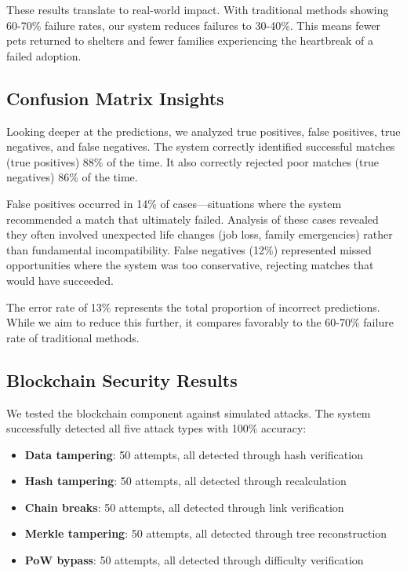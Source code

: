 \documentclass[conference]{IEEEtran}
\begin{document}
These results translate to real-world impact. With traditional methods showing 60-70\% failure rates, our system reduces failures to 30-40\%. This means fewer pets returned to shelters and fewer families experiencing the heartbreak of a failed adoption.

\subsection{Confusion Matrix Insights}

Looking deeper at the predictions, we analyzed true positives, false positives, true negatives, and false negatives. The system correctly identified successful matches (true positives) 88\% of the time. It also correctly rejected poor matches (true negatives) 86\% of the time.

False positives occurred in 14\% of cases—situations where the system recommended a match that ultimately failed. Analysis of these cases revealed they often involved unexpected life changes (job loss, family emergencies) rather than fundamental incompatibility. False negatives (12\%) represented missed opportunities where the system was too conservative, rejecting matches that would have succeeded.

The error rate of 13\% represents the total proportion of incorrect predictions. While we aim to reduce this further, it compares favorably to the 60-70\% failure rate of traditional methods.

\subsection{Blockchain Security Results}

We tested the blockchain component against simulated attacks. The system successfully detected all five attack types with 100\% accuracy:

\begin{itemize}
\item \textbf{Data tampering}: 50 attempts, all detected through hash verification
\item \textbf{Hash tampering}: 50 attempts, all detected through recalculation
\item \textbf{Chain breaks}: 50 attempts, all detected through link verification
\item \textbf{Merkle tampering}: 50 attempts, all detected through tree reconstruction
\item \textbf{PoW bypass}: 50 attempts, all detected through difficulty verification
\end{itemize}
\end{document}
